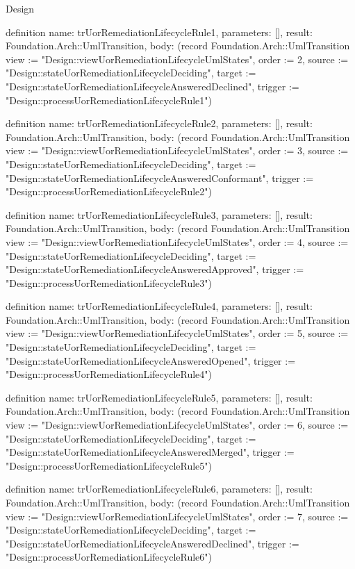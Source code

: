 \begin{lexlean}{Design}
\begin{semanticmodule}
definition{
  name: trUorRemediationLifecycleRule1,
  parameters: [],
  result: Foundation.Arch::UmlTransition,
  body: (record Foundation.Arch::UmlTransition {view := "Design::viewUorRemediationLifecycleUmlStates", order := 2, source := "Design::stateUorRemediationLifecycleDeciding", target := "Design::stateUorRemediationLifecycleAnsweredDeclined", trigger := "Design::processUorRemediationLifecycleRule1"})
}

definition{
  name: trUorRemediationLifecycleRule2,
  parameters: [],
  result: Foundation.Arch::UmlTransition,
  body: (record Foundation.Arch::UmlTransition {view := "Design::viewUorRemediationLifecycleUmlStates", order := 3, source := "Design::stateUorRemediationLifecycleDeciding", target := "Design::stateUorRemediationLifecycleAnsweredConformant", trigger := "Design::processUorRemediationLifecycleRule2"})
}

definition{
  name: trUorRemediationLifecycleRule3,
  parameters: [],
  result: Foundation.Arch::UmlTransition,
  body: (record Foundation.Arch::UmlTransition {view := "Design::viewUorRemediationLifecycleUmlStates", order := 4, source := "Design::stateUorRemediationLifecycleDeciding", target := "Design::stateUorRemediationLifecycleAnsweredApproved", trigger := "Design::processUorRemediationLifecycleRule3"})
}

definition{
  name: trUorRemediationLifecycleRule4,
  parameters: [],
  result: Foundation.Arch::UmlTransition,
  body: (record Foundation.Arch::UmlTransition {view := "Design::viewUorRemediationLifecycleUmlStates", order := 5, source := "Design::stateUorRemediationLifecycleDeciding", target := "Design::stateUorRemediationLifecycleAnsweredOpened", trigger := "Design::processUorRemediationLifecycleRule4"})
}

definition{
  name: trUorRemediationLifecycleRule5,
  parameters: [],
  result: Foundation.Arch::UmlTransition,
  body: (record Foundation.Arch::UmlTransition {view := "Design::viewUorRemediationLifecycleUmlStates", order := 6, source := "Design::stateUorRemediationLifecycleDeciding", target := "Design::stateUorRemediationLifecycleAnsweredMerged", trigger := "Design::processUorRemediationLifecycleRule5"})
}

definition{
  name: trUorRemediationLifecycleRule6,
  parameters: [],
  result: Foundation.Arch::UmlTransition,
  body: (record Foundation.Arch::UmlTransition {view := "Design::viewUorRemediationLifecycleUmlStates", order := 7, source := "Design::stateUorRemediationLifecycleDeciding", target := "Design::stateUorRemediationLifecycleAnsweredDeclined", trigger := "Design::processUorRemediationLifecycleRule6"})
}


\end{semanticmodule}
\end{lexlean}
